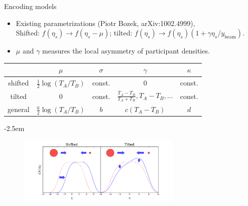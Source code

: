 \documentclass[11pt]{beamer}
\begin{document}
\begin{frame}{Encoding models}
\begin{itemize}
\item Existing parametrizations (Piotr Bozek, arXiv:1002.4999),\\
Shifted: $f(\eta_s) \rightarrow f(\eta_s - \mu)$;  tilted: $f(\eta_s) \rightarrow f(\eta_s) \left(1 + \gamma\eta_s/y_{\textrm{beam}}\right)$.
\item $\mu$ and $\gamma$ measures the local asymmetry of participant densities.
\end{itemize}
\begin{center} 
\begin{tabular}{c|c|c|c|c}
\hline
	&	$\mu$	& $\sigma$ & $\gamma$ & $\kappa$	\\
\hline
shifted & $\frac{1}{2}\log\left(T_A/T_B\right)$ & const. & $0$	& const. \\
tilted & $0$ & const. & $\frac{T_A-T_B}{T_A+T_B}, T_A - T_B, ...$	& const.\\
general & $\frac{a}{2}\log\left(T_A/T_B\right)$ & $b$ & $c(T_A - T_B)$ & $d$ \\
\hline
\end{tabular}
\kern-2.5em
\begin{figure}
\includegraphics[width=0.7\textwidth]{pics/schemes.png} 
\end{figure}
\end{center}
\end{frame}
\end{document}

